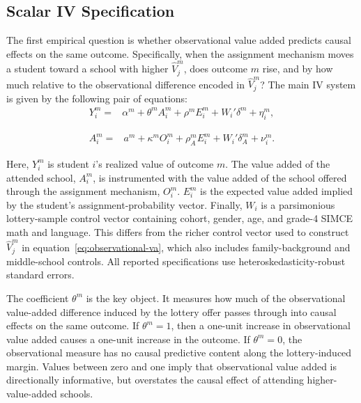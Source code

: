 \documentclass[a4paper, article, english, oneside, unknownkeysallowed, 12pt]{memoir}
\begin{document}
\subsection{Scalar IV Specification}

The first empirical question is whether observational value added predicts causal effects on the same outcome.
Specifically, when the assignment mechanism moves a student toward a school with higher $\widehat{V}_j^m$, does outcome $m$ rise, and by how much relative to the observational difference encoded in $\widehat{V}_j^m$?
The main IV system is given by the following pair of equations:
\noindent
  \begin{equation}
    \begin{aligned}
      Y_i^m ={}& \alpha^m + \theta^m A_i^m + \rho^m E_i^m +  W_i'\delta^m + \eta_i^m,
    \end{aligned}
    \label{eq:pass-through}
  \end{equation}

  \begin{equation}
    \begin{aligned}
      A_i^m ={}& a^m + \kappa^m O_i^m + \rho_A^m E_i^m +  W_i'\delta_A^m + \nu_i^m.
    \end{aligned}
    \label{eq:first-stage}
  \end{equation}

Here, $Y_i^m$ is student $i$'s realized value of outcome $m$. The value added of the attended school, $A_i^m$, is instrumented with the value added of the school offered through the assignment mechanism, $O_i^m$.
$E_i^m$ is the expected value added implied by the student's assignment-probability vector.
Finally, $W_i$ is a parsimonious lottery-sample control vector containing cohort, gender, age, and grade-4 SIMCE math and language.
This differs from the richer control vector used to construct $\widehat{V}_j^m$ in equation~\eqref{eq:observational-va}, which also includes family-background and middle-school controls.
All reported specifications use heteroskedasticity-robust standard errors.

The coefficient $\theta^m$ is the key object.
It measures how much of the observational value-added difference induced by the lottery offer passes through into causal effects on the same outcome.
If $\theta^m=1$, then a one-unit increase in observational value added causes a one-unit increase in the outcome.
If $\theta^m=0$, the observational measure has no causal predictive content along the lottery-induced margin.
Values between zero and one imply that observational value added is directionally informative, but overstates the causal effect of attending higher-value-added schools.
\end{document}
